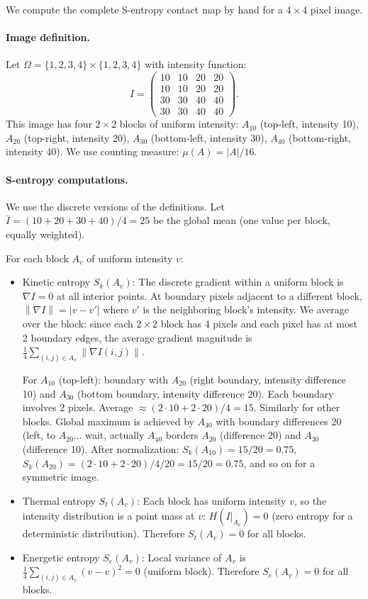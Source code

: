 \documentclass[twocolumn]{article}
\theoremstyle{plain}
\theoremstyle{definition}
\newcommand{\Sk}{S_k}
\newcommand{\St}{S_t}
\newcommand{\Se}{S_e}
\newcommand{\norm}[1]{\left\lVert #1 \right\rVert}
\begin{document}
We compute the complete S-entropy contact map by hand for a $4 \times 4$ pixel
image.

\paragraph{Image definition.} Let $\Omega = \{1,2,3,4\} \times \{1,2,3,4\}$
with intensity function:
\[
I = \begin{pmatrix}
10 & 10 & 20 & 20 \\
10 & 10 & 20 & 20 \\
30 & 30 & 40 & 40 \\
30 & 30 & 40 & 40
\end{pmatrix}.
\]
This image has four $2\times 2$ blocks of uniform intensity: $A_{10}$ (top-left,
intensity 10), $A_{20}$ (top-right, intensity 20), $A_{30}$ (bottom-left,
intensity 30), $A_{40}$ (bottom-right, intensity 40). We use counting measure:
$\mu(A) = |A|/16$.

\paragraph{S-entropy computations.} We use the discrete versions of the definitions.
Let $\bar{I} = (10+20+30+40)/4 = 25$ be the global mean (one value per block,
equally weighted).

For each block $A_v$ of uniform intensity $v$:
\begin{itemize}
\item Kinetic entropy $\Sk(A_v)$: The discrete gradient within a uniform block
  is $\nabla I = 0$ at all interior points. At boundary pixels adjacent to a
  different block, $\norm{\nabla I} = |v - v'|$ where $v'$ is the neighboring
  block's intensity. We average over the block: since each $2\times 2$ block has
  4 pixels and each pixel has at most 2 boundary edges, the average gradient
  magnitude is $\frac{1}{4} \sum_{(i,j) \in A_v} \norm{\nabla I(i,j)}$.

  For $A_{10}$ (top-left): boundary with $A_{20}$ (right boundary, intensity
  difference 10) and $A_{30}$ (bottom boundary, intensity difference 20). Each
  boundary involves 2 pixels. Average $\approx (2 \cdot 10 + 2 \cdot 20)/4 = 15$.
  Similarly for other blocks. Global maximum is achieved by $A_{40}$ with boundary
  differences 20 (left, to $A_{20}$... wait, actually $A_{40}$ borders $A_{20}$
  (difference 20) and $A_{30}$ (difference 10). After normalization: $\Sk(A_{10})
  = 15/20 = 0.75$, $\Sk(A_{20}) = (2\cdot 10 + 2\cdot 20)/4 / 20 = 15/20 = 0.75$,
  and so on for a symmetric image.

\item Thermal entropy $\St(A_v)$: Each block has uniform intensity $v$, so the
  intensity distribution is a point mass at $v$: $H(I|_{A_v}) = 0$ (zero
  entropy for a deterministic distribution). Therefore $\St(A_v) = 0$ for all
  blocks.

\item Energetic entropy $\Se(A_v)$: Local variance of $A_v$ is $\frac{1}{4}
  \sum_{(i,j) \in A_v}(v - v)^2 = 0$ (uniform block). Therefore $\Se(A_v) = 0$
  for all blocks.
\end{itemize}
\end{document}
